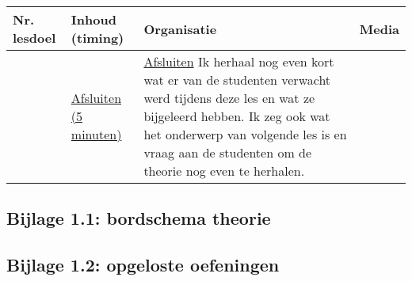 \begin{landscape}
%	
	
	

\begin{tabularx}{1.56\textwidth}{|p{1.5cm}|p{6cm}|X|p{4cm}|}
	\hline
	\textbf{Nr. lesdoel } & \textbf{Inhoud (timing)}  & \textbf{Organisatie } & \textbf{Media } \\ \hline
	&\underline{Afsluiten (5 minuten)}\newline 
	&  \underline{Afsluiten}\newline
	Ik herhaal nog even kort wat er van de studenten verwacht werd tijdens deze les en wat ze bijgeleerd hebben. Ik zeg ook wat het onderwerp van volgende les is en vraag aan de studenten om de theorie nog even te herhalen.
	& 
	\\ \hline
\end{tabularx}
	
	
	
	
\end{landscape}



\subsection*{Bijlage 1.1: bordschema theorie}

\subsection*{Bijlage 1.2: opgeloste oefeningen}




